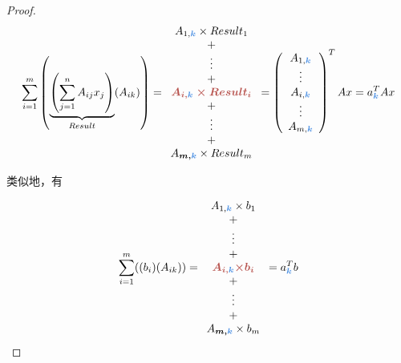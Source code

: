 \begin{proof}
    \begin{equation}\displaystyle \sum _{i=1}^{m}\left(\underbrace{\left(\sum _{j=1}^{n} A_{ij} x_{j}\right)}_{Result}( A_{ik})\right) =\begin{array}{ c }
    A_{1,\textcolor[rgb]{0.29,0.56,0.89}{\boldsymbol{k}}} \times Result_{1}\\
    +\\
    \vdots \\
    +\\
    \boldsymbol{\textcolor[rgb]{0.72,0.33,0.31}{A_{i,\textcolor[rgb]{0.29,0.56,0.89}{\boldsymbol{k}}} \times Result}\textcolor[rgb]{0.72,0.33,0.31}{_{i}}}\\
    +\\
    \vdots \\
    +\\
    A\textcolor[rgb]{0.29,0.56,0.89}{\boldsymbol{_{\textcolor[rgb]{0,0,0}{m,} k}}} \times Result_{m}
    \end{array} =\left(\begin{array}{ c }
    A_{1,\textcolor[rgb]{0.29,0.56,0.89}{\boldsymbol{k}}}\\
    \vdots \\
    A_{i,\textcolor[rgb]{0.29,0.56,0.89}{\boldsymbol{k}}}\\
    \vdots \\
    A_{m,\textcolor[rgb]{0.29,0.56,0.89}{\boldsymbol{k}}}
    \end{array}\right)^{T} Ax=a_{\textcolor[rgb]{0.29,0.56,0.89}{\boldsymbol{k}}}^{T} Ax\end{equation}
        
    类似地，有 
    
    \begin{equation}\displaystyle \sum _{i=1}^{m}(( b_{i})( A_{ik})) =\begin{array}{ c }
    A_{1,\textcolor[rgb]{0.29,0.56,0.89}{\boldsymbol{k}}} \times b_{1}\\
    +\\
    \vdots \\
    +\\
    \boldsymbol{\textcolor[rgb]{0.72,0.33,0.31}{A}\textcolor[rgb]{0.72,0.33,0.31}{_{i,\textcolor[rgb]{0.29,0.56,0.89}{\boldsymbol{k}}}}\textcolor[rgb]{0.72,0.33,0.31}{\times b}\textcolor[rgb]{0.72,0.33,0.31}{_{i}}}\\
    +\\
    \vdots \\
    +\\
    A\textcolor[rgb]{0.29,0.56,0.89}{\boldsymbol{_{\textcolor[rgb]{0,0,0}{m,} k}}} \times b_{m}
    \end{array} =a_{\textcolor[rgb]{0.29,0.56,0.89}{\boldsymbol{k}}}^{T} b\end{equation}
        

\end{proof}
